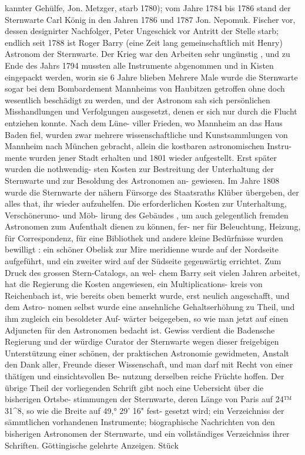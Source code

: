 \documentclass[12pt,a4paper]{article}
\begin{document}
kannter  Gehülfe,  Jon.  Metzger,  starb  1780);  vom  Jahre  1784  bis  1786  stand  der  Sternwarte  Carl  König in  den  Jahren  1786  und  1787  Jon.  Nepomuk. Fischer  vor,  dessen  designirter  Nachfolger,  Peter  Ungeschick vor  Antritt  der  Stelle  starb;  endlich  seit  1788  ist  Roger  Barry  (eine  Zeit  lang  gemeinschaftlich  mit Henry)  Astronom  der  Sternwarte.  Der  Krieg  war  den  Arbeiten  sehr  ungünstig ,  und  zu  Ende  des  Jahrs 1794  mussten  alle  Instrumente  abgenommen  und  in  Kisten  eingepackt  werden,  worin  sie  6  Jahre  blieben Mehrere  Male  wurde  die  Sternwarte  sogar  bei  dem  Bombardement  Mannheims  von  Haubitzen  getroffen ohne  doch  wesentlich  beschädigt  zu  werden,  und  der  Astronom  sah  sich  persönlichen  Misshandlungen und  Verfolgungen  ausgesetzt,  denen  er  sich  nur  durch  die  Flucht  entziehen  konnte.  Nach  dem  Lüne- viller  Frieden,  wo  Mannheim  an  das  Haus  Baden  fiel,  wurden  zwar  mehrere  wissenschaftliche  und Kunstsammlungen  von  Mannheim  nach  München  gebracht,  allein  die  kostbaren  astronomischen  Instru- mente wurden  jener  Stadt  erhalten  und  1801  wieder  aufgestellt.  Erst  später  wurden  die  nothwendig- sten  Kosten  zur  Bestreitung  der  Unterhaltung  der  Sternwarte  und  zur  Besoldung  des  Astronomen  an- gewiesen. Im  Jahre  1808  wurde  die  Sternwarte  der  nähern  Fürsorge  des  Staatsraths  Klüber  übergeben,  der alles  that,  ihr  wieder  aufzuhelfen.  Die  erforderlichen  Kosten  zur  Unterhaltung,  Verschöneruno-  und  Möb- lirung  des  Gebäudes ,  um  auch  gelegentlich  fremden  Astronomen  zum  Aufenthalt  dienen  zu  können,  fer- ner für  Beleuchtung,  Heizung,  für  Correspondenz,  für  eine  Bibliothek  und  andere  kleine  Bedürfnisse wurden  bewilligt :  ein  schöner  Obelisk  zur  Mire  meridienne  wurde  auf  der  Nordseite  aufgeführt,  und  ein zweiter  wird  auf  der  Südseite  gegenwärtig  errichtet.  Zum  Druck  des  grossen  Stern-Catalogs,  an  wel- chem Barry  seit  vielen  Jahren  arbeitet,  hat  die  Regierung  die  Kosten  angewiesen,  ein  Multiplications- kreis  von  Reichenbach  ist,  wie  bereits  oben  bemerkt  wurde,  erst  neulich  angeschafft,  und  dem  Astro- nomen selbst  wurde  eine  ansehnliche  Gehaltserhöhung  zu  Theil,  und  ihm  zugleich  ein  besoldeter  Auf- wärter beigegeben,  so  wie  man  jetzt  auf  einen  Adjuncten  für  den  Astronomen  bedacht  ist. Gewiss  verdient  die  Badensche  Regierung  und  der  würdige  Curator  der  Sternwarte  wegen  dieser freigebigen  Unterstützung  einer  schönen,  der  praktischen  Astronomie  gewidmeten,  Anstalt  den  Dank aller, Freunde  dieser  Wissenschaft,  und  man  darf  mit  Recht  von  einer  thätigen  und  einsichtsvollen  Be- nutzung derselben  reiche  Früchte  hoffen. Der  übrige  Theil  der  vorliegenden  Schrift  gibt  noch  eine  Uebersicht  über  die  bisherigen  Ortsbe- stimmungen der  Sternwarte,  deren  Länge  von  Paris  auf  24™  31\textasciicircum{}8,  so  wie  die  Breite  auf  49,°  29'  16"  fest- gesetzt wird;  ein  Verzeichniss  der  sämmtlichen  vorhandenen  Instrumente;  biographische  Nachrichten von  den  bisherigen  Astronomen  der  Sternwarte,  und  ein  vollständiges  Verzeichniss  ihrer  Schriften. Göttingische  gelehrte  Anzeigen.     Stück  
\end{document}
